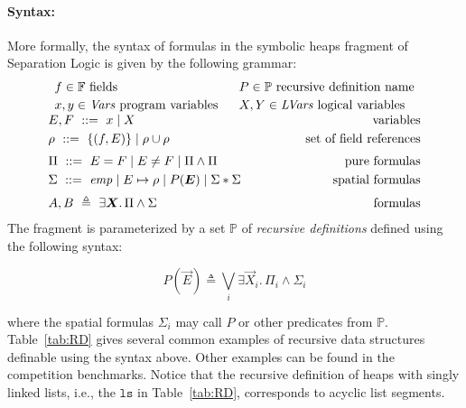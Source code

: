 \documentclass{llncs}
\newcommand{\sep}{.\,}
\newcommand{\posep}{*}
\newcommand{\points}{\mapsto}
\newcommand{\vars}{\mathit{Vars}}
\newcommand{\lvars}{\mathit{LVars}}
\newcommand{\pfields}{\mathbb{F}}
\newcommand{\preds}{\mathbb{P}}
\newcommand{\ls}{\mathtt{ls}}
\begin{document}
\paragraph{Syntax:}
More formally, the syntax of formulas in the symbolic heaps fragment of Separation Logic
is given by the following grammar:
$$
\begin{array}{c}
\begin{array}{ll}
f \in \pfields \mbox{ fields} ~&~
P \in \preds \mbox{ recursive definition name}
\\[0.8mm]
x,y \in \vars \mbox{ program variables} ~&~
X,Y \in \lvars \mbox{ logical variables}
\end{array}
\\[2mm]
%
%
E,F\ ::=\ x \mid X 
\hfill \mbox{variables}
\\[1mm]
\rho\ ::=\ \{ (f,E) \} \mid \rho\cup\rho 
\hfill \mbox{set of field references}
\\[2mm]
%
\Pi\ ::=\ E = F \mid E \neq F \mid \Pi \land \Pi \hfill 
\mbox{pure formulas}\\[1mm]
%
\Sigma\ ::=\
\mathit{emp} \mid
E \points \rho \mid 
P(\vec{E}) \mid 
\Sigma \posep \Sigma 
%
\hspace{1cm}\hfill \mbox{spatial formulas}
\\[2mm]
A,B\ \triangleq\ \exists \vec{X}\sep \Pi\land\Sigma \hfill \mbox{formulas} %
\end{array}
$$
The fragment is parameterized by a set $\preds$ of
\emph{recursive definitions} defined using the following syntax:

\begin{equation}\label{eq:RD}
P(\vec{E}) \triangleq \bigvee_i \exists \vec{X}_i\sep \Pi_i \land \Sigma_i
\end{equation}

\noindent where the spatial formulas $\Sigma_i$ may call $P$ or other predicates from $\preds$.
Table~\ref{tab:RD} gives several common examples of recursive data structures definable using the syntax above. Other examples can be found in the competition benchmarks.
%
Notice that the recursive definition of heaps with singly linked lists, i.e., the $\ls$ in Table~\ref{tab:RD},
corresponds to acyclic list segments.
\end{document}
